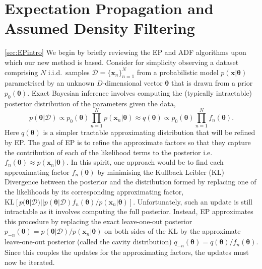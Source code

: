 

\section{Expectation Propagation and Assumed Density Filtering}
\ref{sec:EPintro}
We begin by briefly reviewing the EP and ADF algorithms upon which our new method is based. Consider for simplicity observing a dataset comprising $N$ i.i.d.~samples $\mathcal{D} = \{\bm{x}_n \}_{n=1}^N$ from a probabilistic model $p(\bm{x}|\bm{\theta})$ parametrised by an unknown $D$-dimensional vector $\bm{\theta}$ that is drawn from a prior $p_0(\bm{\theta})$. Exact Bayesian inference involves computing the (typically intractable) posterior distribution of the parameters given the data, 
\begin{equation}
p(\bm{\theta} | \mathcal{D}) \propto p_0(\bm{\theta}) \prod_{n=1}^{N} p(\bm{x}_n | \bm{\theta}) \approx q(\bm{\theta}) \propto p_0(\bm{\theta}) \prod_{n=1}^{N} f_n(\bm{\theta}).
\end{equation}
%
Here $q(\bm{\theta})$  is a simpler tractable approximating distribution that will be refined by EP.
%
%
%
The goal of EP is to refine the approximate factors so that they capture the contribution of each of the likelihood terms to the posterior i.e.~$f_n(\bm{\theta}) \approx p(\bm{x}_n | \bm{\theta})$. In this spirit, one approach would be to find each approximating factor $f_n(\bm{\theta})$ by minimising the Kullback Leibler (KL) Divergence between the posterior and the distribution formed by replacing one of the likelihoods by its corresponding approximating factor,  $\mathrm{KL}[p(\bm{\theta}|\mathcal{D}) || p(\bm{\theta}|\mathcal{D}) f_n(\bm{\theta})/ p(\bm{x}_n | \bm{\theta})]$. Unfortunately, such an update is still intractable as it involves computing the full posterior. Instead, EP approximates this procedure by replacing the exact leave-one-out posterior $p_{-n}(\bm{\theta}) = p(\bm{\theta}|\mathcal{D}) / p(\bm{x}_n | \bm{\theta})$ on both sides of the KL by the approximate leave-one-out posterior (called the cavity distribution) $q_{-n}(\bm{\theta}) =q(\bm{\theta})/f_n(\bm{\theta})$. Since this couples the updates for the approximating factors, the updates must now be iterated.

